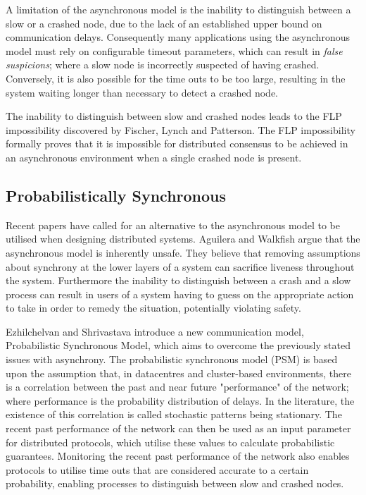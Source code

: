 	A limitation of the asynchronous model is the inability to distinguish between a slow or a crashed node, due to the lack of an established upper bound on communication delays.  Consequently many applications using the asynchronous model must rely on configurable timeout parameters, which can result in \emph{false suspicions}; where a slow node is incorrectly suspected of having crashed.  Conversely, it is also possible for the time outs to be too large, resulting in the system waiting longer than necessary to detect a crashed node.  
	
	The inability to distinguish between slow and crashed nodes leads to the FLP impossibility discovered by Fischer, Lynch and Patterson\citep{Fischer:1985:IDC:3149.214121}.  The FLP impossibility formally proves that it is impossible for distributed consensus to be achieved in an asynchronous environment when a single crashed node is present. 
	
	\subsection{Probabilistically Synchronous}\label{ssec:probabilistically_synchronous}
	Recent papers have called for an alternative to the asynchronous model to be utilised when designing distributed systems. Aguilera and Walkfish\citep{Aguilera:2009:NTA:1855568.1855571} argue that the asynchronous model is inherently unsafe. They believe that removing assumptions about synchrony at the lower layers of a system can sacrifice liveness throughout the system. Furthermore the inability to distinguish between a crash and a slow process can result in users of a system having to guess on the appropriate action to take in order to remedy the situation, potentially violating safety. 

Ezhilchelvan and Shrivastava\citep{Ezhilchelvan:2010:LPR:1773912.1773927} introduce a new communication model, Probabilistic Synchronous Model, which aims to overcome the previously stated issues with asynchrony. The probabilistic synchronous model (PSM) is based upon the assumption that, in datacentres and cluster-based environments, there is a correlation between the past and near future "performance" of the network; where performance is the probability distribution of delays. In the literature, the existence of this correlation is called stochastic patterns being stationary. The recent past performance of the network can then be used as an input parameter for distributed protocols, which utilise these values to calculate probabilistic guarantees. Monitoring the recent past performance of the network also enables protocols to utilise time outs that are considered accurate to a certain probability, enabling processes to distinguish between slow and crashed nodes. 


